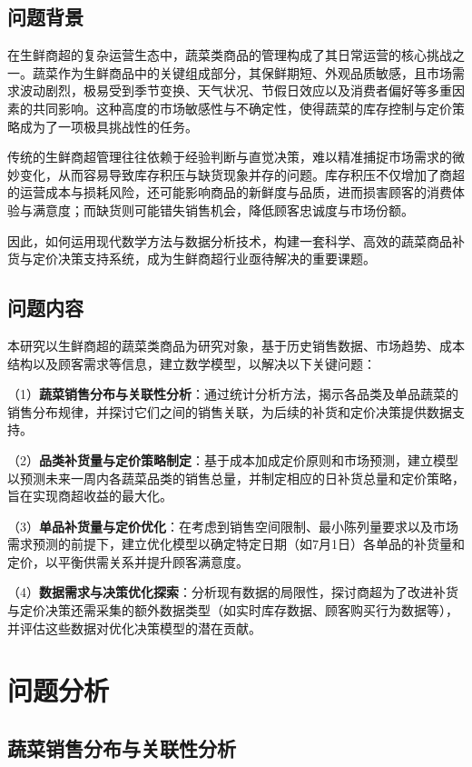\documentclass{cumcmthesis}
\begin{document}
\subsection{问题背景}

在生鲜商超的复杂运营生态中，蔬菜类商品的管理构成了其日常运营的核心挑战之一。蔬菜作为生鲜商品中的关键组成部分，其保鲜期短、外观品质敏感，且市场需求波动剧烈，极易受到季节变换、天气状况、节假日效应以及消费者偏好等多重因素的共同影响。这种高度的市场敏感性与不确定性，使得蔬菜的库存控制与定价策略成为了一项极具挑战性的任务。

传统的生鲜商超管理往往依赖于经验判断与直觉决策，难以精准捕捉市场需求的微妙变化，从而容易导致库存积压与缺货现象并存的问题。库存积压不仅增加了商超的运营成本与损耗风险，还可能影响商品的新鲜度与品质，进而损害顾客的消费体验与满意度；而缺货则可能错失销售机会，降低顾客忠诚度与市场份额。

因此，如何运用现代数学方法与数据分析技术，构建一套科学、高效的蔬菜商品补货与定价决策支持系统，成为生鲜商超行业亟待解决的重要课题。

\subsection{问题内容}

本研究以生鲜商超的蔬菜类商品为研究对象，基于历史销售数据、市场趋势、成本结构以及顾客需求等信息，建立数学模型，以解决以下关键问题：

（1）\textbf{蔬菜销售分布与关联性分析}：通过统计分析方法，揭示各品类及单品蔬菜的销售分布规律，并探讨它们之间的销售关联，为后续的补货和定价决策提供数据支持。

（2）\textbf{品类补货量与定价策略制定}：基于成本加成定价原则和市场预测，建立模型以预测未来一周内各蔬菜品类的销售总量，并制定相应的日补货总量和定价策略，旨在实现商超收益的最大化。

（3）\textbf{单品补货量与定价优化}：在考虑到销售空间限制、最小陈列量要求以及市场需求预测的前提下，建立优化模型以确定特定日期（如7月1日）各单品的补货量和定价，以平衡供需关系并提升顾客满意度。

（4）\textbf{数据需求与决策优化探索}：分析现有数据的局限性，探讨商超为了改进补货与定价决策还需采集的额外数据类型（如实时库存数据、顾客购买行为数据等），并评估这些数据对优化决策模型的潜在贡献。

\section{问题分析}

\subsection{蔬菜销售分布与关联性分析}
\end{document}
